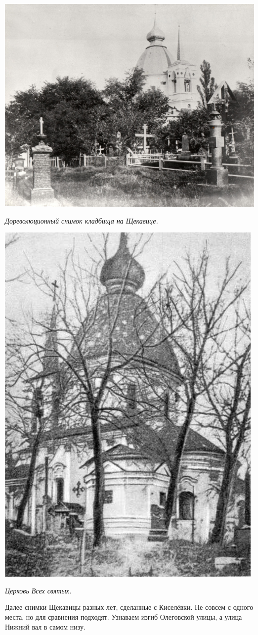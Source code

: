 \begin{center}
\includegraphics[width=\linewidth]{chast-colebanie-osnov/sheka/sheka_kladb2.jpg}

\textit{Дореволюционный снимок кладбища на Щекавице.}
\end{center}

\begin{center}
\includegraphics[width=0.50\linewidth]{chast-colebanie-osnov/sheka/vseh.jpg}

\textit{Церковь Всех святых.}
\end{center}


Далее снимки Щекавицы разных лет, сделанные с Киселёвки. Не совсем с одного места, но для сравнения подходят. Узнаваем изгиб Олеговской улицы, а улица Нижний вал в самом низу.

